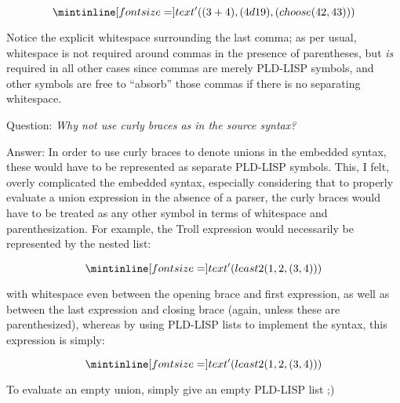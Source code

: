 $$
\ms{'((3 + 4), (4 d 19), (choose (42 , 43)))}
$$

Notice the explicit whitespace surrounding the last comma; as per usual,
whitespace is not required around commas in the presence of parentheses, but
\emph{is} required in all other cases since commas are merely PLD-LISP symbols,
and other symbols are free to ``absorb'' those commas if there is no separating
whitespace.

\bigskip

Question: \emph{Why not use curly braces as in the source syntax?}

Answer: In order to use curly braces to denote unions in the embedded syntax,
these would have to be represented as separate PLD-LISP symbols. This, I felt,
overly complicated the embedded syntax, especially considering that to properly
evaluate a union expression in the absence of a parser, the curly braces would
have to be treated as any other symbol in terms of whitespace and
parenthesization. For example, the Troll expression 
would necessarily be represented by the nested list:

$$
\ms{'(least 2 ({ 1 , 2 , ({ 3 , 4 }) }))}
$$

with whitespace even between the opening brace and first expression, as well as
between the last expression and closing brace (again, unless these are
parenthesized), whereas by using PLD-LISP lists to implement the syntax, this
expression is simply:

$$
\ms{'(least 2 (1 , 2 , (3 , 4)))}
$$

To evaluate an empty union, simply give an empty PLD-LISP list ;)


\sectend
